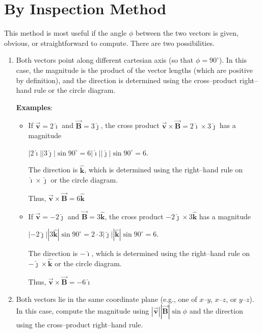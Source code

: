 \documentclass{article}
\newcommand{\ihat}[0]{\hat{\boldsymbol{\imath}}}
\newcommand{\jhat}[0]{\hat{\boldsymbol{\jmath}}}
\newcommand{\khat}[0]{\hat{\boldsymbol{k}}}
\newcommand{\bfvec}[1]{\vec{\mathbf{#1}}}
\begin{document}
\section{By Inspection Method}

This method is most useful if the angle $\phi$ between the two vectors is given, obvious, or straightforward to compute. There are two possibilities.

\begin{enumerate}

  \item Both vectors point along different cartesian axis (so that $\phi=90^\circ$). In this case, the magnitude is the product of the vector lengths (which are positive by definition), and the direction is determined using the cross--product right--hand rule or the circle diagram.

        \textbf{Examples}:

    \begin{itemize}

      \item If $\bfvec{v}=2\ihat$ and $\bfvec{B}=3\jhat$, the cross product $\bfvec{v}\times\bfvec{B}=2\ihat\times3\jhat$ has a magnitude

            $|2\ihat||3\jhat|\sin 90^\circ = 6|\ihat||\jhat|\sin 90^\circ = 6$.

            The direction is $\khat$, which is determined using the right--hand rule on $\ihat\times\jhat$ or the circle diagram.

            Thus, $\bfvec{v}\times\bfvec{B} = 6\khat$

      \item If $\bfvec{v}=-2\jhat$ and $\bfvec{B}=3\khat$, the cross product $-2\jhat\times3\khat$ has a magnitude

            $|-2\jhat||3\khat|\sin 90^\circ = 2\cdot 3|\jhat||\khat|\sin 90^\circ = 6$.

            The direction is $-\ihat$, which is determined using the right--hand rule on $-\jhat\times\khat$ or the circle diagram.

            Thus, $\bfvec{v}\times\bfvec{B}=-6\ihat$

    \end{itemize}

  \item Both vectors lie in the same coordinate plane (e.g., one of $x$--$y$, $x$--$z$, or $y$--$z$). In this case, compute the magnitude using $|\bfvec{v}||\bfvec{B}|\sin\phi$ and the direction using the cross--product right--hand rule.


\end{enumerate}
\end{document}
